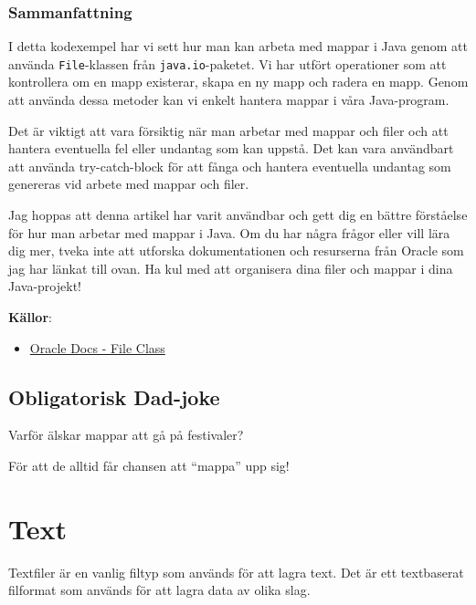 \hypertarget{sammanfattning}{%
\subsubsection{Sammanfattning}\label{sammanfattning}}

I detta kodexempel har vi sett hur man kan arbeta med mappar i Java
genom att använda \texttt{File}-klassen från \texttt{java.io}-paketet.
Vi har utfört operationer som att kontrollera om en mapp existerar,
skapa en ny mapp och radera en mapp. Genom att använda dessa metoder kan
vi enkelt hantera mappar i våra Java-program.

Det är viktigt att vara försiktig när man arbetar med mappar och filer
och att hantera eventuella fel eller undantag som kan uppstå. Det kan
vara användbart att använda try-catch-block för att fånga och hantera
eventuella undantag som genereras vid arbete med mappar och filer.

Jag hoppas att denna artikel har varit användbar och gett dig en bättre
förståelse för hur man arbetar med mappar i Java. Om du har några frågor
eller vill lära dig mer, tveka inte att utforska dokumentationen och
resurserna från Oracle som jag har länkat till ovan. Ha kul med att
organisera dina filer och mappar i dina Java-projekt!

\textbf{Källor}:

\begin{itemize}
\tightlist
\item
  \href{https://docs.oracle.com/en/java/javase/17/docs/api/java.base/java/io/File.html}{Oracle
  Docs - File Class}
\end{itemize}

\hypertarget{obligatorisk-dad-joke}{%
\subsection{Obligatorisk Dad-joke}\label{obligatorisk-dad-joke}}

Varför älskar mappar att gå på festivaler?

För att de alltid får chansen att ``mappa'' upp sig!

\hypertarget{text}{%
\section{Text}\label{text}}

Textfiler är en vanlig filtyp som används för att lagra text. Det är ett
textbaserat filformat som används för att lagra data av olika slag.

